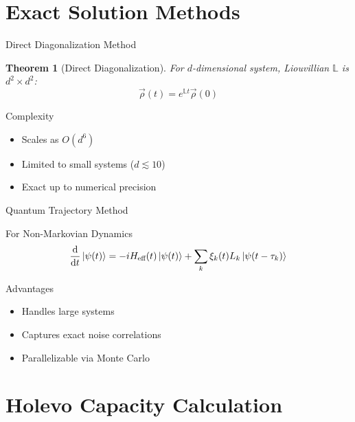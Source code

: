 \documentclass{beamer}
\theoremstyle{definition}
\theoremstyle{plain}
\newtheorem{thm}{Theorem}[section]
\begin{document}
\section{Exact Solution Methods}

\begin{frame}{Direct Diagonalization Method}
    \begin{thm}[Direct Diagonalization]
        For $d$-dimensional system, Liouvillian $\mathbb{L}$ is $d^2 \times d^2$:
        \[
        \vec{\rho}(t) = e^{\mathbb{L}t} \vec{\rho}(0)
        \]
    \end{thm}
    
    \begin{block}{Complexity}
        \begin{itemize}
            \item Scales as $O(d^6)$
            \item Limited to small systems ($d \lesssim 10$)
            \item Exact up to numerical precision
        \end{itemize}
    \end{block}
\end{frame}

\begin{frame}{Quantum Trajectory Method}
    \begin{block}{For Non-Markovian Dynamics}
        \[
        \dv{}{t} \ket{\psi(t)} = -i H_{\text{eff}}(t) \ket{\psi(t)} + \sum_k \xi_k(t) L_k \ket{\psi(t - \tau_k)}
        \]
    \end{block}
    
    \begin{block}{Advantages}
        \begin{itemize}
            \item Handles large systems
            \item Captures exact noise correlations
            \item Parallelizable via Monte Carlo
        \end{itemize}
    \end{block}
\end{frame}

\section{Holevo Capacity Calculation}
\end{document}
